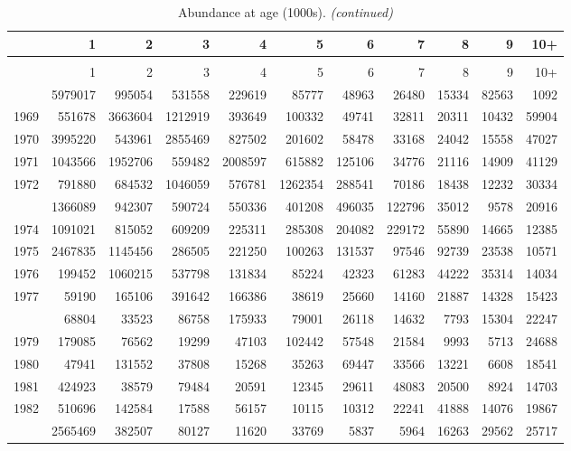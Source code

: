 \documentclass[
]{article}
\begin{document}
\begin{longtable}[t]{lrrrrrrrrrr}
\caption{\label{tab:NAA-table}Abundance at age (1000s).}\\
\toprule
  & 1 & 2 & 3 & 4 & 5 & 6 & 7 & 8 & 9 & 10+\\
\midrule
\endfirsthead
\caption[]{Abundance at age (1000s). \textit{(continued)}}\\
\toprule
  & 1 & 2 & 3 & 4 & 5 & 6 & 7 & 8 & 9 & 10+\\
\midrule
\endhead

\endfoot
\bottomrule
\endlastfoot
1968 & 5979017 & 995054 & 531558 & 229619 & 85777 & 48963 & 26480 & 15334 & 82563 & 1092\\
1969 & 551678 & 3663604 & 1212919 & 393649 & 100332 & 49741 & 32811 & 20311 & 10432 & 59904\\
1970 & 3995220 & 543961 & 2855469 & 827502 & 201602 & 58478 & 33168 & 24042 & 15558 & 47027\\
1971 & 1043566 & 1952706 & 559482 & 2008597 & 615882 & 125106 & 34776 & 21116 & 14909 & 41129\\
1972 & 791880 & 684532 & 1046059 & 576781 & 1262354 & 288541 & 70186 & 18438 & 12232 & 30334\\
\addlinespace
1973 & 1366089 & 942307 & 590724 & 550336 & 401208 & 496035 & 122796 & 35012 & 9578 & 20916\\
1974 & 1091021 & 815052 & 609209 & 225311 & 285308 & 204082 & 229172 & 55890 & 14665 & 12385\\
1975 & 2467835 & 1145456 & 286505 & 221250 & 100263 & 131537 & 97546 & 92739 & 23538 & 10571\\
1976 & 199452 & 1060215 & 537798 & 131834 & 85224 & 42323 & 61283 & 44222 & 35314 & 14034\\
1977 & 59190 & 165106 & 391642 & 166386 & 38619 & 25660 & 14160 & 21887 & 14328 & 15423\\
\addlinespace
1978 & 68804 & 33523 & 86758 & 175933 & 79001 & 26118 & 14632 & 7793 & 15304 & 22247\\
1979 & 179085 & 76562 & 19299 & 47103 & 102442 & 57548 & 21584 & 9993 & 5713 & 24688\\
1980 & 47941 & 131552 & 37808 & 15268 & 35263 & 69447 & 33566 & 13221 & 6608 & 18541\\
1981 & 424923 & 38579 & 79484 & 20591 & 12345 & 29611 & 48083 & 20500 & 8924 & 14703\\
1982 & 510696 & 142584 & 17588 & 56157 & 10115 & 10312 & 22241 & 41888 & 14076 & 19867\\
\addlinespace
1983 & 2565469 & 382507 & 80127 & 11620 & 33769 & 5837 & 5964 & 16263 & 29562 & 25717\\

\end{longtable}
\end{document}
